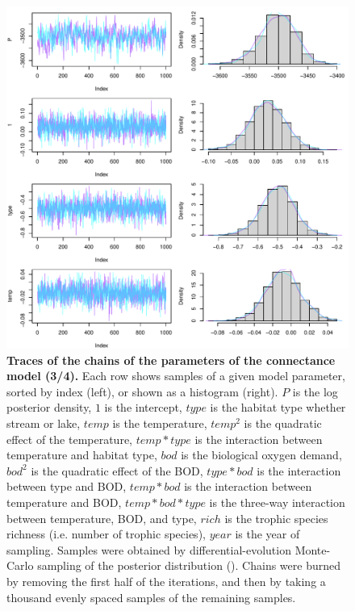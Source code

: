 \documentclass[11pt, oneside]{article}
\begin{document}
\begin{figure}[H]
\begin{center}
\includegraphics[page=3, width=1\linewidth]{b0_6_2/out_con/fig_tracePlot_beta.pdf}
\caption{
    \textbf{Traces of the chains of the parameters of the connectance model (3/4).}
    Each row shows samples of a given model parameter, sorted by index (left), or shown as a histogram (right).
    $P$ is the log posterior density, $1$ is the intercept, $type$ is the habitat type whether stream or lake, $temp$ is the temperature, $temp^2$ is the quadratic effect of the temperature, $temp * type$ is the interaction between temperature and habitat type, $bod$ is the biological oxygen demand, $bod^2$ is the quadratic effect of the BOD, $type * bod$ is the interaction between type and BOD, $temp * bod$ is the interaction between temperature and BOD, $temp * bod * type$ is the three-way interaction between temperature, BOD, and type, $rich$ is the trophic species richness (i.e. number of trophic species), $year$ is the year of sampling.
    Samples were obtained by differential-evolution Monte-Carlo sampling of the posterior distribution (\cite{TerBraak2006}).
    Chains were burned by removing the first half of the iterations, and then by taking a thousand evenly spaced samples of the remaining samples.
}
\end{center}
\end{figure}
\end{document}
